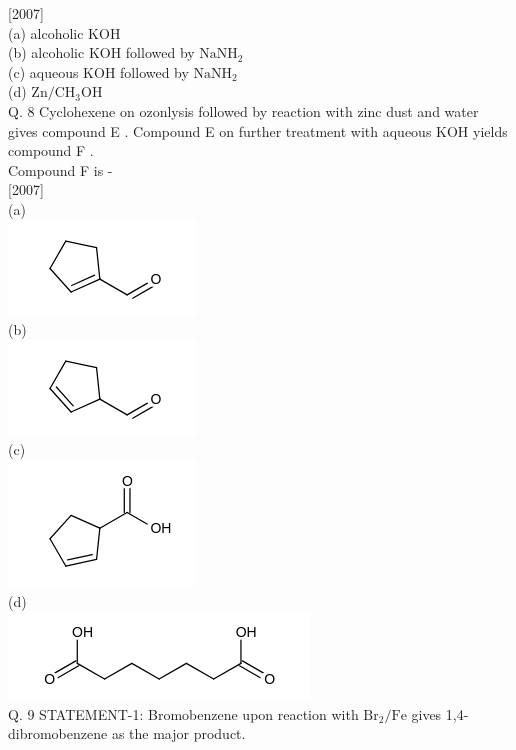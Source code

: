 \documentclass[10pt]{article}
\begin{document}
[2007]\\
(a) alcoholic KOH\\
(b) alcoholic KOH followed by $\mathrm{NaNH}_{2}$\\
(c) aqueous KOH followed by $\mathrm{NaNH}_{2}$\\
(d) $\mathrm{Zn} / \mathrm{CH}_{3} \mathrm{OH}$\\
Q. 8 Cyclohexene on ozonlysis followed by reaction with zinc dust and water gives compound E . Compound E on further treatment with aqueous KOH yields compound F .\\
Compound F is -\\[0pt]
[2007]\\
(a)\\
\includegraphics{smile-b9edcc5bbdbefc2badc449219c97d10f0135a719}\\
(b)\\
\includegraphics{smile-aa0cbfa1d666c1253b1fd54400f2eeab3268ef3b}\\
(c)\\
\includegraphics{smile-f3462f97a4de786e87bee2dee4fde99058020b53}\\
(d)\\
\includegraphics{smile-0011d6f4915394d9414ed2a92f9d9ff5fb17a871}\\
Q. 9 STATEMENT-1: Bromobenzene upon reaction with $\mathrm{Br}_{2} / \mathrm{Fe}$ gives 1,4-dibromobenzene as the major product.\\[0pt]
\end{document}
